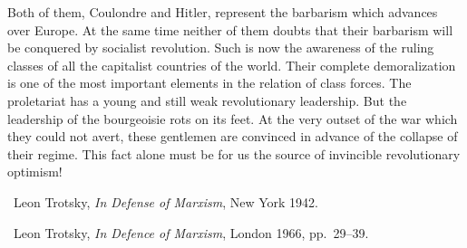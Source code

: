 Both of them, Coulondre and Hitler, represent the barbarism which advances over Europe. At the same time neither of them doubts that their barbarism will be conquered by socialist revolution. Such is now the awareness of the ruling classes of all the capitalist countries of the world. Their complete demoralization is one of the most important elements in the relation of class forces. The proletariat has a young and still weak revolutionary leadership. But the leadership of the bourgeoisie rots on its feet. At the very outset of the war which they could not avert, these gentlemen are convinced in advance of the collapse of their regime. This fact alone must be for us the source of invincible revolutionary optimism!

\begin{letterinfo}
  \firstpublished\ Leon Trotsky, \emph{In Defense of Marxism}, New York 1942.
  
  \checkedagainst\ Leon Trotsky, \emph{In Defence of Marxism}, London 1966, pp.~29--39.
\end{letterinfo}